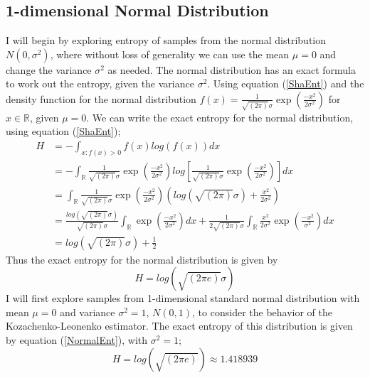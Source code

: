 \documentclass{article}
\begin{document}
\subsection{1-dimensional Normal Distribution} \label{Normal_d=1}

I will begin by exploring entropy of samples from the normal distribution $N(0, \sigma^2)$, where without loss of generality we can use the mean $\mu = 0$ and change the variance $\sigma^2$ as needed. The normal distribution has an exact formula to work out the entropy, given the variance $\sigma^2$. Using equation (\ref{ShaEnt}) and the density function for the normal distribution $f(x) = \frac{1}{\sqrt{(2\pi)} \sigma}\exp{ \left( \frac{-x^2}{2\sigma^2} \right)}$ for $x \in \mathbb{R}$, given $\mu = 0$. We can write the exact entropy for the normal distribution, using equation (\ref{ShaEnt});
\begin{align}
H &= - \int_{x : f(x) > 0} f(x) log(f(x)) dx \nonumber \\
&= - \int_{\mathbb{R}} \frac{1}{\sqrt{(2\pi)} \sigma}\exp{ \left( \frac{-x^2}{2\sigma^2} \right)} log \left[\frac{1}{\sqrt{(2\pi)} \sigma}\exp{ \left( \frac{-x^2}{2\sigma^2} \right)} \right] dx \nonumber \\
&=  \int_{\mathbb{R}} \frac{1}{\sqrt{(2\pi)} \sigma}\exp{ \left( \frac{-x^2}{2\sigma^2} \right)} \left( log(\sqrt{(2\pi)}\sigma) +  \frac{x^2}{2\sigma^2} \right) \nonumber \\
&= \frac{log(\sqrt{(2\pi)}\sigma)}{\sqrt{(2\pi)} \sigma} \int_{\mathbb{R}} \exp{ \left( \frac{-x^2}{2\sigma^2} \right)} dx +  \frac{1}{2\sqrt{(2\pi)} \sigma} \int_{\mathbb{R}} \frac{x^2}{2\sigma^2}  \exp{ \left( \frac{-x^2}{\sigma^2} \right)} dx \nonumber \\
&=  log(\sqrt{(2\pi)}\sigma) + \frac{1}{2} \nonumber 
\end{align}
Thus the exact entropy for the normal distribution is given by 
\begin{equation}\label{NormalEnt}
H =  log(\sqrt{(2\pi e)}\sigma) 
\end{equation}
I will first explore samples from 1-dimensional standard normal distribution with mean $\mu = 0$ and variance $\sigma^2 = 1$, $N(0, 1)$, to consider the behavior of the Kozachenko-Leonenko estimator. The exact entropy of this distribution is given by equation (\ref{NormalEnt}), with $\sigma^2=1$;
\begin{equation} \label{normal_exact}
H = log(\sqrt{(2\pi e)}) \approx 1.418939
\end{equation}
\end{document}
